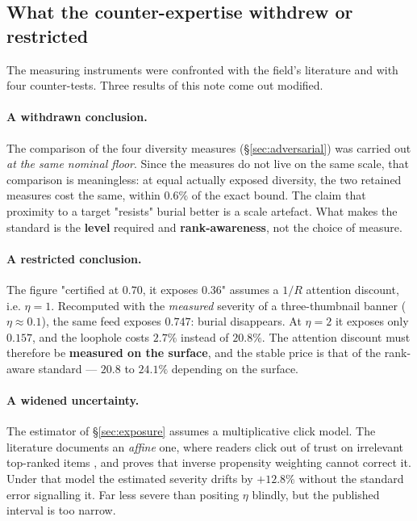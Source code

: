 \documentclass[11pt,a4paper]{article}
\begin{document}
\subsection{What the counter-expertise withdrew or restricted}
\label{sec:counterexpertise}

The measuring instruments were confronted with the field's literature and with four
counter-tests. Three results of this note come out modified.

\paragraph{A withdrawn conclusion.} The comparison of the four diversity measures
(\S\ref{sec:adversarial}) was carried out \emph{at the same nominal floor}. Since the measures do
not live on the same scale, that comparison is meaningless: at equal actually exposed diversity,
the two retained measures cost the same, within $0.6\%$ of the exact bound. The claim that
proximity to a target "resists" burial better is a scale artefact. What makes the standard is the
\textbf{level} required and \textbf{rank-awareness}, not the choice of measure.

\paragraph{A restricted conclusion.} The figure "certified at $0.70$, it exposes $0.36$" assumes a
$1/R$ attention discount, i.e. $\eta = 1$. Recomputed with the \emph{measured} severity of a
three-thumbnail banner ($\eta \approx 0.1$), the same feed exposes $0.747$: burial disappears. At
$\eta = 2$ it exposes only $0.157$, and the loophole costs $2.7\%$ instead of $20.8\%$. The
attention discount must therefore be \textbf{measured on the surface}, and the stable price is
that of the rank-aware standard --- $20.8$ to $24.1\%$ depending on the surface.

\paragraph{A widened uncertainty.} The estimator of \S\ref{sec:exposure} assumes a multiplicative
click model. The literature documents an \emph{affine} one, where readers click out of trust on
irrelevant top-ranked items \citep{vardasbi2020}, and proves that inverse propensity weighting
cannot correct it. Under that model the estimated severity drifts by $+12.8\%$ without the
standard error signalling it. Far less severe than positing $\eta$ blindly, but the published
interval is too narrow.
\end{document}
